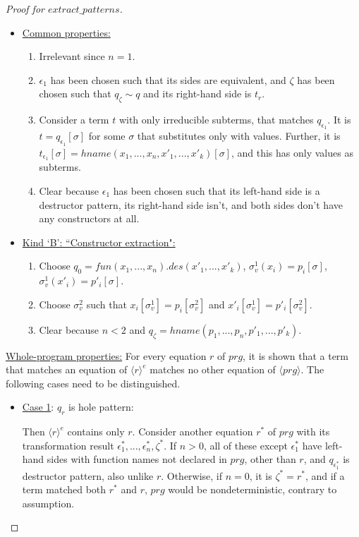 \documentclass[11pt]{article} %
\begin{document}
\begin{proof}[Proof for $extract\_patterns$]
\begin{itemize}
\begin{itemize}
\item \underline{Common properties:}
\begin{enumerate}
\item Irrelevant since $n = 1$.
\item $\epsilon_1$ has been chosen such that its sides are equivalent, and $\zeta$ has been chosen such that $q_\zeta \sim q$ and its right-hand side is $t_r$.
\item Consider a term $t$ with only irreducible subterms, that matches $q_{\epsilon_1}$. It is $t = q_{\epsilon_1}[\sigma]$ for some $\sigma$ that substitutes only with values. Further, it is $t_{\epsilon_1}[\sigma] = hname(x_1, ..., x_n, x'_1, ..., x'_k)[\sigma]$, and this has only values as subterms.
\item Clear because $\epsilon_1$ has been chosen such that its left-hand side is a destructor pattern, its right-hand side isn't, and both sides don't have any constructors at all.
\end{enumerate}

\item \underline{Kind `B': ``Constructor extraction":}
\begin{enumerate}
\item Choose $q_0 = fun(x_1, ..., x_n).des(x'_1, ..., x'_k)$, $\sigma^1_v(x_i) = p_i[\sigma]$, $\sigma^1_v(x'_i) = p'_i[\sigma]$.
\item Choose $\sigma^2_v$ such that $x_i[\sigma^1_v] = p_i[\sigma^2_v]$ and $x'_i[\sigma^1_v] = p'_i[\sigma^2_v]$.
\item Clear because $n < 2$ and $q_\zeta = hname(p_1, ..., p_n, p'_1, ..., p'_k)$.
\end{enumerate}

\end{itemize}

\end{itemize}

\underline{Whole-program properties:} For every equation $r$ of $prg$, it is shown that a term that matches an equation of $\langle r \rangle^e$ matches no other equation of $\langle prg \rangle$. The following cases need to be distinguished.

\begin{itemize}

\item \underline{Case 1}: $q_r$ is hole pattern:

Then $\langle r \rangle^e$ contains only $r$. Consider another equation $r^*$ of $prg$ with its transformation result $\epsilon^*_1, ..., \epsilon^*_n, \zeta^*$. If $n > 0$, all of these except $\epsilon^*_1$ have left-hand sides with function names not declared in $prg$, other than $r$, and $q_{\epsilon^*_1}$ is destructor pattern, also unlike $r$. Otherwise, if $n = 0$, it is $\zeta^* = r^*$, and if a term matched both $r^*$ and $r$, $prg$ would be nondeterministic, contrary to assumption.


\end{itemize}
\end{proof}
\end{document}
